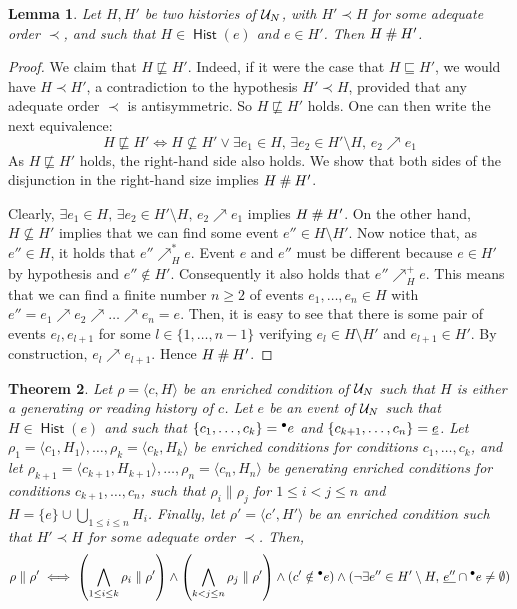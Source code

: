 \documentclass[12pt,a4paper]{article}
\newtheorem{theorem}{Theorem}
\newtheorem{lemma}[theorem]{Lemma}
\newcommand{\hist}[1]{\ensuremath{\mathop{\mathsf{Hist}}{(#1)}}}
\newcommand{\confl}{\ensuremath\mathbin\#}
\newcommand{\evolves}{\ensuremath{\sqsubseteq}}
\begin{document}
\begin{lemma}
\label{lem:two.histories}
Let $H, H'$ be two histories of $\mathcal{U}_{N}$, with $H' \prec H$ for some adequate
order $\prec$, and such that $H \in \hist{e}$ and $e \in H'$.  Then $H \confl
H'$.
\end{lemma}

\begin{proof}
We claim that $H \not\sqsubseteq H'$.  Indeed, if it were the case that $H
\evolves H'$, we would have $H \prec H'$, a contradiction to the hypothesis $H'
\prec H$, provided that any adequate order $\prec$ is antisymmetric.  So $H
\not\sqsubseteq H'$ holds.  One can then write the next equivalence: $$H
\not\sqsubseteq H' \iff H \not\subseteq H' \lor \exists e_1 \in H,\, \exists
e_2 \in H' \setminus H,\, e_2 \nearrow e_1$$  As $H \not\sqsubseteq H'$ holds,
the right-hand side also holds.  We show that both sides of the disjunction in
the right-hand size implies $H \confl H'$.

Clearly, $\exists e_1 \in H,\, \exists e_2 \in H' \setminus H,\, e_2 \nearrow
e_1$ implies $H \confl H'$.  On the other hand, $H \not\subseteq H'$ implies
that we can find some event $e'' \in H \setminus H'$.  Now notice that, as $e''
\in H$, it holds that $e'' \nearrow^*_H e$.  Event $e$ and $e''$ must be
different because $e \in H'$ by hypothesis and $e'' \notin H'$.  Consequently
it also holds that $e'' \nearrow^+_H e$.  This means that we can find a finite
number $n \ge 2$ of events $e_1, \ldots, e_n \in H$ with $e'' = e_1 \nearrow
e_2 \nearrow \ldots \nearrow e_n = e$.  Then, it is easy to see that there is
some pair of events $e_l, e_{l+1}$ for some $l \in \{1, \ldots, n - 1\}$
verifying $e_l \in H \setminus H'$ and $e_{l+1} \in H'$.  By construction, $e_l
\nearrow e_{l+1}$.  Hence $H \confl H'$.
\end{proof}

\begin{theorem}
Let $\rho = \langle c, H \rangle$ be an enriched condition of $\mathcal{U}_{N}$ such
that $H$ is either a generating or reading history of $c$.  Let $e$ be an event
of $\mathcal{U}_{N}$ such that $H \in \hist{e}$ and such that $\{c_1, \ldots, c_k\} =
{}^\bullet e$ and $\{c_{k+1}, \ldots, c_n\} = \underline{e}$.  Let $\rho_1 = \langle c_1,
H_1 \rangle, \ldots, \rho_k = \langle c_k, H_k \rangle$ be enriched conditions
for conditions $c_1, \ldots, c_k$, and let $\rho_{k+1} = \langle c_{k+1},
H_{k+1} \rangle, \ldots, \rho_n = \langle c_n, H_n \rangle$ be generating
enriched conditions for conditions $c_{k+1}, \ldots, c_n$, such that $\rho_i
\parallel \rho_j$ for $1 \le i < j \le n$ and $H = \{e\} \cup \bigcup_{1 \le i
\le n} H_i$.  Finally, let $\rho' = \langle c', H' \rangle$ be an enriched
condition such that $H' \prec H$ for some adequate order $\prec$.  Then, $$\rho
\parallel \rho' \iff
\left ( \bigwedge_{1 \le i \le k} \rho_i \parallel \rho' \right ) \land 
\left ( \bigwedge_{k < j \le n} \rho_j \parallel \rho' \right ) \land 
\left ( c' \notin {}^\bullet e \right ) \land
\left ( \lnot \exists e'' \in H' \setminus H,\, \underline{e''} \cap {}^\bullet e \ne
\emptyset \right )$$
\end{theorem}
\end{document}
